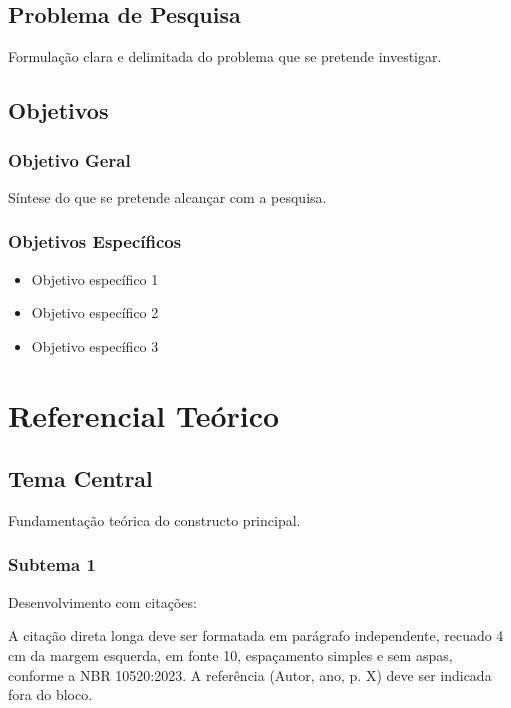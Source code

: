 \documentclass[
  12pt,
  openright,
  twoside,
  a4paper,
  brazilian
]{abntex2}
\begin{document}
\section{Problema de Pesquisa}

Formulação clara e delimitada do problema que se pretende investigar.

\section{Objetivos}

\subsection{Objetivo Geral}

Síntese do que se pretende alcançar com a pesquisa.

\subsection{Objetivos Específicos}

\begin{itemize}
  \item Objetivo específico 1
  \item Objetivo específico 2
  \item Objetivo específico 3
\end{itemize}

\chapter[Referencial Teórico]{Referencial Teórico}

\section{Tema Central}

Fundamentação teórica do constructo principal.

\subsection{Subtema 1}

Desenvolvimento com citações:

\begin{citacao}
A citação direta longa deve ser formatada em parágrafo independente, recuado
4 cm da margem esquerda, em fonte 10, espaçamento simples e sem aspas,
conforme a NBR 10520:2023. A referência (Autor, ano, p. X) deve ser indicada
fora do bloco.
\end{citacao}
\end{document}
